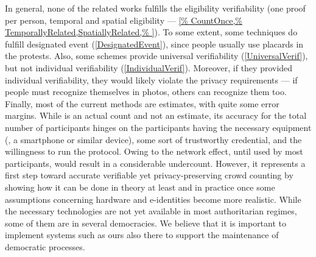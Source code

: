 In general, none of the related works fulfills the eligibility
verifiability (one proof per person, temporal and spatial eligibility ---
\cref{%
  CountOnce,%
  TemporallyRelated,SpatiallyRelated,%
}).
To some extent, some techniques do fulfill designated event (\cref{DesignatedEvent}), since people usually use placards in the protests.
Also, some schemes provide universal verifiability (\cref{UniversalVerif}), but not individual verifiability (\cref{IndividualVerif}).
Moreover, if they provided individual verifiability, they would likely violate 
the privacy requirements --- if people must recognize themselves in photos, 
others can recognize them too.
Finally, most of the current methods are estimates, with quite some error margins. 
While \PRIVO is an actual count and not an estimate, its accuracy for the total number of participants hinges on the participants having the necessary equipment (\ie, a smartphone or similar device), some sort of trustworthy credential, and the willingness to run the protocol. 
Owing to the network effect, until used by most participants, \PRIVO would result in a considerable undercount. 
However, it represents a first step toward accurate verifiable yet privacy-preserving crowd counting by showing how it can be done in theory at least and in practice once some assumptions concerning hardware and e-identities become more realistic. 
While the necessary technologies are not yet available in most authoritarian regimes, some of them are in several democracies. We believe that it is important to implement systems such as ours also there to support the maintenance of democratic processes.


